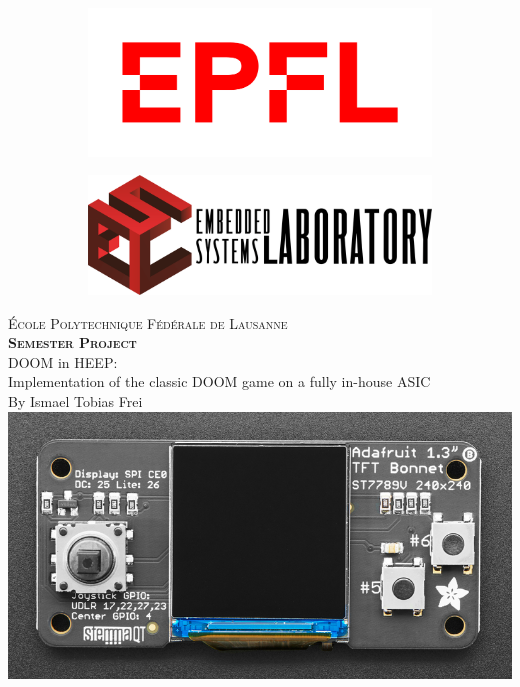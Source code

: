 \begin{titlepage}
 
    \centering
    
    \begin{figure}
    \centering
    \begin{subfigure}{.5\textwidth}
      \centering
      \includegraphics[width=.7\linewidth, left]{images/images_front_page/EPFL_logo.png}
    \end{subfigure}%
    \begin{subfigure}{.5\textwidth}
      \centering
      \includegraphics[width=.7\linewidth, right]{images/images_front_page/ESL_logo.png}
    \end{subfigure}
    
    \end{figure}

    \vspace{2cm}
    
    \textsc{\Large École Polytechnique Fédérale de Lausanne}
    \\ [1cm]
    \textbf{\textsc{\LARGE Semester Project}}
    \\ [1cm]
    {\Large DOOM in HEEP: }
    \\
    {\Large Implementation of the classic DOOM game on a fully in-house ASIC}
    \\ [0.75cm]
    {\large By Ismael Tobias Frei}
    \\ [1cm]
    \includegraphics[width=0.8\linewidth]{images/Adafruit_Front.jpg}
    \\[1cm]
    

\end{titlepage}
